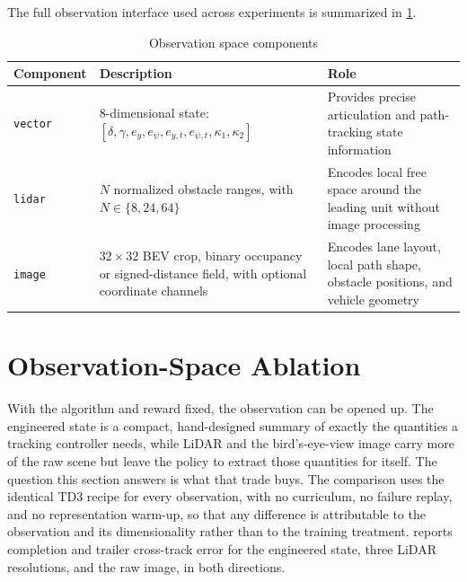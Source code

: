 The full observation interface used across experiments is summarized in \cref{tab:observation_components}.

\begin{table}[H]
\centering
\caption{Observation space components}
\label{tab:observation_components}
\begin{tabular}{p{3cm} p{5cm} p{5cm}}
\toprule
Component & Description & Role \\
\midrule
\texttt{vector} & 8-dimensional state: $[\delta,\gamma,e_y,e_\psi,e_{y,t},e_{\psi,t},\kappa_1,\kappa_2]$ & Provides precise articulation and path-tracking state information \\
\texttt{lidar} & $N$ normalized obstacle ranges, with $N \in \{8,24,64\}$ & Encodes local free space around the leading unit without image processing \\
\texttt{image}  & $32 \times 32$ BEV crop, binary occupancy or signed-distance field, with optional coordinate channels & Encodes lane layout, local path shape, obstacle positions, and vehicle geometry \\
\bottomrule
\end{tabular}
\end{table}

\section{Observation-Space Ablation}
\label{sec:obs_ablation}

With the algorithm and reward fixed, the observation can be opened up. The engineered state is a compact, hand-designed summary of exactly the quantities a tracking controller needs, while LiDAR and the bird's-eye-view image carry more of the raw scene but leave the policy to extract those quantities for itself. The question this section answers is what that trade buys. The comparison uses the identical TD3 recipe for every observation, with no curriculum, no failure replay, and no representation warm-up, so that any difference is attributable to the observation and its dimensionality rather than to the training treatment.  reports completion and trailer cross-track error for the engineered state, three LiDAR resolutions, and the raw image, in both directions.



